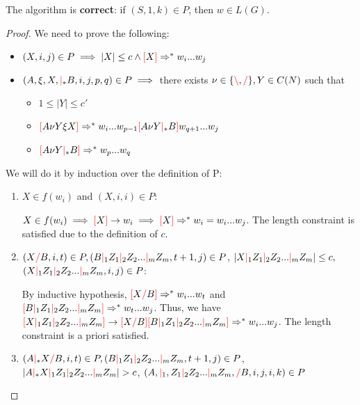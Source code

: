 \documentclass[main.tex]{subfiles}
\begin{document}
\begin{prop}
    The algorithm is \textbf{correct}: if $(S, 1, k) \in P$, then $w \in L(G)$.
\end{prop}
\begin{proof}
    We need to prove the following:

    \begin{itemize}
        \item $(X, i, j) \in P \implies |X| \leq c \land \textcolor{red}{[} X \textcolor{red}{]} \Rightarrow^* w_i ... w_j$
        \item $(A, \xi, X, \textcolor{red}{|}_* B, i, j, p, q) \in P \implies$
            there exists $\nu \in \{ \textcolor{red}{\backslash}, \textcolor{red}{/} \}, Y \in C(N)$ such that
            \begin{itemize}
                \item $1 \leq |Y| \leq c'$
                \item $\textcolor{red}{[} A \nu Y \xi X \textcolor{red}{]} \Rightarrow^* w_i ... w_{p - 1} \textcolor{red}{[} A \nu Y \textcolor{red}{|}_* B \textcolor{red}{]} w_{q + 1} ... w_j$
                \item $\textcolor{red}{[} A \nu Y \textcolor{red}{|}_* B \textcolor{red}{]} \Rightarrow^* w_p ... w_q$
            \end{itemize}
    \end{itemize}

    We will do it by induction over the definition of P:

    \begin{enumerate}
    \item $X \in f(w_i)$ and $(X, i, i) \in P$:

        $X \in f(w_i) \implies \textcolor{red}{[} X \textcolor{red}{]} \rightarrow w_i \implies \textcolor{red}{[} X \textcolor{red}{]} \Rightarrow^* w_i = w_i ... w_j$.
        The length constraint is satisfied due to the definition of $c$.

    \item $(X \textcolor{red}{/} B, i, t) \in P, (B \textcolor{red}{|}_1 Z_1 \textcolor{red}{|}_2 Z_2 ... \textcolor{red}{|}_m Z_m, t + 1, j) \in P$,
        $|X \textcolor{red}{|}_1 Z_1 \textcolor{red}{|}_2 Z_2 ... \textcolor{red}{|}_m Z_m| \leq c,$
        $(X \textcolor{red}{|}_1 Z_1 \textcolor{red}{|}_2 Z_2 ... \textcolor{red}{|}_m Z_m, i, j) \in P$:

        By inductive hypothesis, $\textcolor{red}{[} X \textcolor{red}{/} B \textcolor{red}{]} \Rightarrow^* w_i ... w_t$
        and $\textcolor{red}{[} B \textcolor{red}{|}_1 Z_1 \textcolor{red}{|}_2 Z_2 ... \textcolor{red}{|}_m Z_m \textcolor{red}{]} \Rightarrow^* w_t ... w_j$.
        Thus, we have $\textcolor{red}{[} X \textcolor{red}{|}_1 Z_1 \textcolor{red}{|}_2 Z_2 ... \textcolor{red}{|}_m Z_m \textcolor{red}{]} \rightarrow
        \textcolor{red}{[} X \textcolor{red}{/} B \textcolor{red}{]} \textcolor{red}{[} B \textcolor{red}{|}_1 Z_1 \textcolor{red}{|}_2 Z_2 ... \textcolor{red}{|}_m Z_m \textcolor{red}{]}
        \Rightarrow^* w_i ... w_j$. The length constraint is a priori satisfied.

    \item $(A \textcolor{red}{|}_* X \textcolor{red}{/} B, i, t) \in P, (B \textcolor{red}{|}_1 Z_1 \textcolor{red}{|}_2 Z_2 ... \textcolor{red}{|}_m Z_m, t + 1, j) \in P$,
        $|A \textcolor{red}{|}_* X \textcolor{red}{|}_1 Z_1 \textcolor{red}{|}_2 Z_2 ... \textcolor{red}{|}_m Z_m| > c$,
        $(A, \textcolor{red}{|}_1, Z_1 \textcolor{red}{|}_2 Z_2 ... \textcolor{red}{|}_m Z_m, \textcolor{red}{/} B, i, j, i, k) \in P$


\end{enumerate}
\end{proof}
\end{document}
